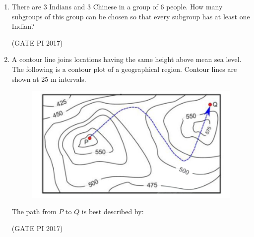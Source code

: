 \documentclass[journal,12pt,onecolumn]{IEEEtran}
\theoremstyle{remark}
\begin{document}
\begin{enumerate}
\item There are 3 Indians and 3 Chinese in a group of 6 people.  
How many subgroups of this group can be chosen so that every subgroup has at least one Indian?
\begin{enumerate}
\end{enumerate}
\hfill (GATE PI 2017)

\item A contour line joins locations having the same height above mean sea level.  
The following is a contour plot of a geographical region. Contour lines are shown at 25 m intervals.  

\begin{figure}[h]
    \centering
    \includegraphics[width=0.5\columnwidth]{fig12.png}
    \caption{}
    \label{fig:placeholder}
\end{figure}

The path from $P$ to $Q$ is best described by:
\begin{enumerate}
\end{enumerate}
\hfill (GATE PI 2017)

\end{enumerate}

\newpage


\end{document}
